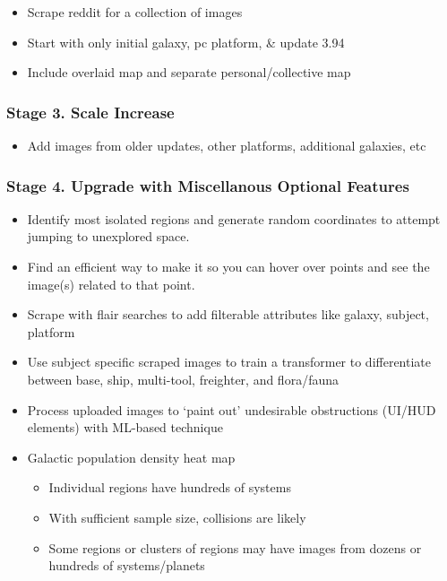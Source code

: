\documentclass[
]{article}
\providecommand{\tightlist}{%
  \setlength{\itemsep}{0pt}\setlength{\parskip}{0pt}}
\begin{document}
\begin{itemize}
\tightlist
\item
  Scrape reddit for a collection of images\\
\item
  Start with only initial galaxy, pc platform, \& update 3.94\\
\item
  Include overlaid map and separate personal/collective map
\end{itemize}

\hypertarget{stage-3.-scale-increase}{%
\subsubsection{Stage 3. Scale Increase}\label{stage-3.-scale-increase}}

\begin{itemize}
\tightlist
\item
  Add images from older updates, other platforms, additional galaxies,
  etc
\end{itemize}

\hypertarget{stage-4.-upgrade-with-miscellanous-optional-features}{%
\subsubsection{Stage 4. Upgrade with Miscellanous Optional
Features}\label{stage-4.-upgrade-with-miscellanous-optional-features}}

\begin{itemize}
\tightlist
\item
  Identify most isolated regions and generate random coordinates to
  attempt jumping to unexplored space.
\item
  Find an efficient way to make it so you can hover over points and see
  the image(s) related to that point.\\
\item
  Scrape with flair searches to add filterable attributes like galaxy,
  subject, platform\\
\item
  Use subject specific scraped images to train a transformer to
  differentiate between base, ship, multi-tool, freighter, and
  flora/fauna\\
\item
  Process uploaded images to `paint out' undesirable obstructions
  (UI/HUD elements) with ML-based technique\\
\item
  Galactic population density heat map

  \begin{itemize}
  \tightlist
  \item
    Individual regions have hundreds of systems\\
  \item
    With sufficient sample size, collisions are likely\\
  \item
    Some regions or clusters of regions may have images from dozens or
    hundreds of systems/planets
  \end{itemize}
\end{itemize}
\end{document}
